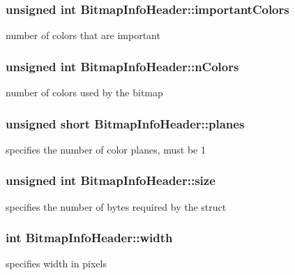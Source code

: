 \subsubsection[{\texorpdfstring{important\+Colors}{importantColors}}]{\setlength{\rightskip}{0pt plus 5cm}unsigned int Bitmap\+Info\+Header\+::important\+Colors}\hypertarget{structBitmapInfoHeader_a9d87941fcc414085f7361fd89818ee3f}{}\label{structBitmapInfoHeader_a9d87941fcc414085f7361fd89818ee3f}
number of colors that are important 
\subsubsection[{\texorpdfstring{n\+Colors}{nColors}}]{\setlength{\rightskip}{0pt plus 5cm}unsigned int Bitmap\+Info\+Header\+::n\+Colors}\hypertarget{structBitmapInfoHeader_a4c543a08d1b72bdda2329b426a213e2a}{}\label{structBitmapInfoHeader_a4c543a08d1b72bdda2329b426a213e2a}
number of colors used by the bitmap 
\subsubsection[{\texorpdfstring{planes}{planes}}]{\setlength{\rightskip}{0pt plus 5cm}unsigned short Bitmap\+Info\+Header\+::planes}\hypertarget{structBitmapInfoHeader_a9925e97e8bbc6b797afe2d22fbab45d6}{}\label{structBitmapInfoHeader_a9925e97e8bbc6b797afe2d22fbab45d6}
specifies the number of color planes, must be 1 
\subsubsection[{\texorpdfstring{size}{size}}]{\setlength{\rightskip}{0pt plus 5cm}unsigned int Bitmap\+Info\+Header\+::size}\hypertarget{structBitmapInfoHeader_a411fa70f6547a0360b33edcd3273d169}{}\label{structBitmapInfoHeader_a411fa70f6547a0360b33edcd3273d169}
specifies the number of bytes required by the struct 
\subsubsection[{\texorpdfstring{width}{width}}]{\setlength{\rightskip}{0pt plus 5cm}int Bitmap\+Info\+Header\+::width}\hypertarget{structBitmapInfoHeader_ac2034cfbada460819beed1ee24581c5d}{}\label{structBitmapInfoHeader_ac2034cfbada460819beed1ee24581c5d}
specifies width in pixels 
